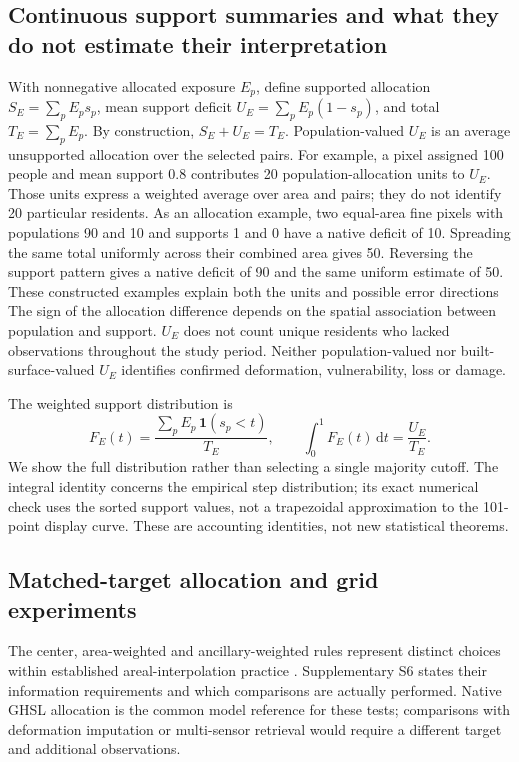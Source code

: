 \documentclass[pdflatex,sn-nature]{sn-jnl}
\providecommand{\DIFadd}[1]{{\protect\color{blue} \sf #1}} %
\providecommand{\DIFdel}[1]{{\protect\color{red} \scriptsize #1}} %
\providecommand{\DIFaddbegin}{} %
\providecommand{\DIFaddend}{} %
\providecommand{\DIFdelbegin}{} %
\providecommand{\DIFdelend}{} %
\begin{document}
\subsection{Continuous \DIFaddbegin \DIFadd{support }\DIFaddend summaries and \DIFdelbegin \DIFdel{what they do not estimate}\DIFdelend \DIFaddbegin \DIFadd{their interpretation}\DIFaddend }
With nonnegative allocated exposure $E_p$, define supported allocation $S_E=\sum_p E_p s_p$, mean support deficit $U_E=\sum_p E_p(1-s_p)$, and total $T_E=\sum_p E_p$. By construction, $S_E+U_E=T_E$. Population-valued $U_E$ is an average unsupported allocation over the selected pairs. For example, a pixel assigned 100 people and mean support 0.8 contributes 20 population-allocation units to $U_E$. Those units express a weighted average over area and pairs; they do not identify 20 particular residents. As an allocation example, two equal-area fine pixels with populations 90 and 10 and supports 1 and 0 have a native deficit of 10. Spreading the same total uniformly across their combined area gives 50. Reversing the support pattern gives a native deficit of 90 and the same uniform estimate of 50. \DIFdelbegin \DIFdel{These constructed examples explain both the units and possible error directions}\DIFdelend \DIFaddbegin \DIFadd{The sign of the allocation difference depends on the spatial association between population and support}\DIFaddend . $U_E$ does not count unique residents who lacked observations throughout the study period. Neither population-valued nor built-surface-valued $U_E$ identifies confirmed deformation, vulnerability, loss or damage.

The weighted support distribution is
\begin{equation}
F_E(t)=\frac{\sum_p E_p\,\mathbf{1}(s_p<t)}{T_E},\qquad
\int_0^1 F_E(t)\,\mathrm{d}t=\frac{U_E}{T_E}.
\end{equation}
We show the full distribution rather than selecting a single majority cutoff. The integral identity concerns the empirical step distribution; its exact numerical check uses the sorted support values, not a trapezoidal approximation to the 101-point display curve.
\DIFdelbegin \DIFdel{These are accounting identities, not new statistical theorems.
}\DIFdelend 

\subsection{Matched-target allocation and grid experiments}
The center, area-weighted and ancillary-weighted rules represent distinct choices within established areal-interpolation practice \citep{eicher2001dasymetric,mennis2003population}. Supplementary S6 states their information requirements and which comparisons are actually performed. Native GHSL allocation is the common model reference for these tests; comparisons with deformation imputation or multi-sensor retrieval would require a different target and additional observations.
\end{document}
